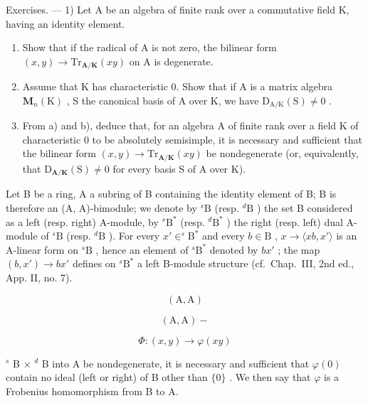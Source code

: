 Exercises. — 1) Let A be an algebra of finite rank over a commutative field K, having an identity element.

\begin{enumerate}
\def\labelenumi{\alph{enumi})}
\item
  Show that if the radical of A is not zero, the bilinear form \((x, y) \to \mathrm{Tr}_{\mathbf{A}/\mathbf{K}}(xy)\) on A is degenerate.
\item
  Assume that K has characteristic 0. Show that if A is a matrix algebra \(\mathbf{M}_{n}(\mathrm{K})\) , S the canonical basis of A over K, we have \(\mathrm{D}_{\mathrm{A}/\mathrm{K}}(\mathrm{S}) \neq 0\) .
\item
  From a) and b), deduce that, for an algebra A of finite rank over a field K of characteristic 0 to be absolutely semisimple, it is necessary and sufficient that the bilinear form \((x,y)\to\mathrm{Tr}_{\mathbf{A}/\mathbf{K}}(xy)\) be nondegenerate (or, equivalently, that \(\mathrm{D}_{\mathbf{A}/\mathbf{K}}(\mathrm{S})\neq0\) for every basis S of A over K).
\end{enumerate}

Let B be a ring, A a subring of B containing the identity element of B; B is therefore an (A, A)-bimodule; we denote by \(^s\text{B}\) (resp. \(^d\text{B}\) ) the set B considered as a left (resp. right) A-module, by \(^s\text{B}^*\) (resp. \(^d\text{B}^*\) ) the right (resp. left) dual A-module of \(^s\text{B}\) (resp. \(^d\text{B}\) ). For every \(x' \in ^s\text{B}^*\) and every \(b \in \text{B}\) , \(x \to \langle xb, x' \rangle\) is an A-linear form on \(^s\text{B}\) , hence an element of \(^s\text{B}^*\) denoted by \(bx'\) ; the map \((b, x') \to bx'\) defines on \(^s\text{B}^*\) a left B-module structure (cf.~Chap.~III, 2nd ed., App. II, no. 7).

\[
(\mathrm{A}, \mathrm{A})
\]

\[
(\mathrm{A}, \mathrm{A}) -
\]

\[
\Phi : (x, y) \rightarrow \varphi (x y)
\]

\(^{s}\) B × \(^{d}\) B into A be nondegenerate, it is necessary and sufficient that \(\varphi(0)\) contain no ideal (left or right) of B other than \(\{0\}\) . We then say that \(\varphi\) is a Frobenius homomorphism from B to A.

